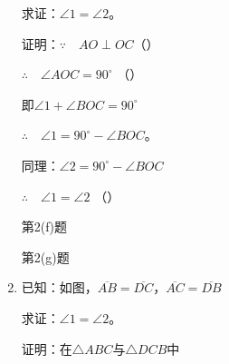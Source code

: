 \begin{Exercise}
\begin{question}
\begin{enumerate}
求证：$\angle 1=\angle 2$。

证明：$\because\quad AO\perp OC$（\qquad ）

$\therefore\quad \angle AOC=90^{\circ}$ （\qquad ）

即$\angle 1+\angle BOC=90^{\circ}$

$\therefore\quad \angle 1=90^{\circ}-\angle BOC$。

同理：$\angle 2=90^{\circ}-\angle BOC$

$\therefore\quad \angle 1=\angle 2$ （\qquad ）

\begin{figurehere}
    \begin{minipage}[b]{0.48\linewidth}
    \centering
\begin{tikzpicture}[>=latex, scale=1.2]
    \end{tikzpicture}
    \caption*{第2(f)题}
    \end{minipage}
    \begin{minipage}[b]{0.48\linewidth}
    \centering
    \begin{tikzpicture}[>=latex, scale=1]
    \end{tikzpicture}
    \caption*{第2(g)题}
    \end{minipage}
    \end{figurehere}

\item 已知：如图，$\overline{AB}=\overline{DC}$，$\overline{AC}=\overline{DB}$

求证：$\angle 1=\angle 2$。

证明：在$\triangle ABC$与$\triangle DCB$中


\end{enumerate}
\end{question}
\end{Exercise}
